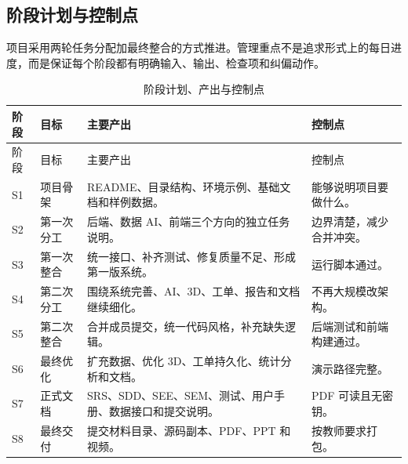 \documentclass[12pt,a4paper]{ctexart}
\begin{document}
\subsection{阶段计划与控制点}
项目采用两轮任务分配加最终整合的方式推进。管理重点不是追求形式上的每日进度，而是保证每个阶段都有明确输入、输出、检查项和纠偏动作。
\begin{longtable}{L{2.0cm}L{3.2cm}L{5.2cm}L{4.2cm}}
\caption{阶段计划、产出与控制点}\\
\toprule
阶段 & 目标 & 主要产出 & 控制点 \\
\midrule
\endfirsthead
\toprule
阶段 & 目标 & 主要产出 & 控制点 \\
\midrule
\endhead
S1 & 项目骨架 & README、目录结构、环境示例、基础文档和样例数据。 & 能够说明项目要做什么。 \\
S2 & 第一次分工 & 后端、数据 AI、前端三个方向的独立任务说明。 & 边界清楚，减少合并冲突。 \\
S3 & 第一次整合 & 统一接口、补齐测试、修复质量不足、形成第一版系统。 & 运行脚本通过。 \\
S4 & 第二次分工 & 围绕系统完善、AI、3D、工单、报告和文档继续细化。 & 不再大规模改架构。 \\
S5 & 第二次整合 & 合并成员提交，统一代码风格，补充缺失逻辑。 & 后端测试和前端构建通过。 \\
S6 & 最终优化 & 扩充数据、优化 3D、工单持久化、统计分析和文档。 & 演示路径完整。 \\
S7 & 正式文档 & SRS、SDD、SEE、SEM、测试、用户手册、数据接口和提交说明。 & PDF 可读且无密钥。 \\
S8 & 最终交付 & 提交材料目录、源码副本、PDF、PPT 和视频。 & 按教师要求打包。 \\
\bottomrule
\end{longtable}
\end{document}
